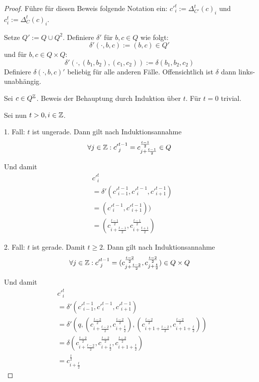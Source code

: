\begin{proof}
    Führe für diesen Beweis folgende Notation ein: ${c'}^{t}_i := \Delta^{t}_{C'}(c)_i$ und $c^t_i := \Delta^{t}_{C}(c)_i$.
    
    Setze $Q' := Q \cup Q^2$. Definiere $\delta'$ für $ b, c \in Q$ wie folgt:
    \[
        \delta'(\cdot, b, c) := (b, c) \in Q'
    \]
    und für $b, c \in Q \times Q$:
    \[
        \delta'(\cdot, (b_1, b_2), (c_1, c_2)) := \delta(b_1, b_2, c_2)
    \]
    Definiere $\delta(\cdot, b, c)'$ beliebig für alle anderen Fälle. Offensichtlich ist $\delta$ dann links-unabhängig.
    
    Sei $c \in Q^{\mathbb{Z}}$. Beweis der Behauptung durch Induktion über $t$. Für $t = 0$ trivial.
    
    Sei nun $t > 0, i \in \mathbb{Z}$.
    
    1. Fall: $t$ ist ungerade.
    Dann gilt nach Induktionsannahme
    \[
        \forall j \in \mathbb{Z}: {c'}^{t-1}_j = c^{\frac{t-1}{2}}_{j+\frac{t-1}{2}} \in Q
    \]
    
    Und damit
    \begin{align*}
        & {c'}^{t}_i \\
        &= \delta'({c'}^{t-1}_{i-1}, {c'}^{t-1}_i, {c'}^{t-1}_{i+1}) \\
        &= ({c'}^{t-1}_i, {c'}^{t-1}_{i+1})) \\
        &= (c^{\frac{t-1}{2}}_{i+\frac{t-1}{2}}, c^{\frac{t-1}{2}}_{i+\frac{t+1}{2}})
    \end{align*}
    
    2. Fall: $t$ ist gerade. Damit $t \geq 2$.
    Dann gilt nach Induktionsannahme
    \[
        \forall j \in \mathbb{Z}: {c'}^{t-1}_j
            = (c^{\frac{t-2}{2}}_{j+\frac{t-2}{2}}, c^{\frac{t-2}{2}}_{j+\frac{t}{2}}) \in Q \times Q
    \]
    
    Und damit
    \begin{align*}
        & {c'}^{t}_i \\
        &= \delta'({c'}^{t-1}_{i-1}, {c'}^{t-1}_i, {c'}^{t-1}_{i+1}) \\
        &= \delta'(q,  (c^{\frac{t-2}{2}}_{i+\frac{t-2}{2}}, c^{\frac{t-2}{2}}_{i+\frac{t}{2}}),
             (c^{\frac{t-2}{2}}_{i+1+\frac{t-2}{2}}, c^{\frac{t-2}{2}}_{i+1+\frac{t}{2}})) \\
        &= \delta(c^{\frac{t-2}{2}}_{i+\frac{t-2}{2}}, c^{\frac{t-2}{2}}_{i+\frac{t}{2}},
                c^{\frac{t-2}{2}}_{i+1+\frac{t}{2}}) \\
        &= c^{\frac{t}{2}}_{i+\frac{t}{2}}
    \end{align*}
    
\end{proof}

